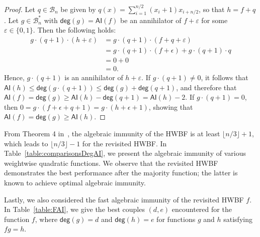 \documentclass[runningheads,orivec]{llncs}
\newcommand{\AI}{\mathsf{AI}}
\newcommand{\BN}{\mathcal{B}_n}
\newcommand{\degg}{\mathsf{deg}}
\newcommand{\hwbf}{\textsf{HWBF}}
\let\leq=\leqslant
\let\geq=\geqslant
\begin{document}
    \begin{proof}
    	Let $q\in\BN$ be given by $q(x)=\sum_{i=1}^{n/2} (x_i+1) x_{i+n/2}$, so that $h=f+q$.
    	Let $g\in\BN^*$ with $\degg(g)=\AI(f)$ be an annihilator of $f+ \varepsilon$ for some $\varepsilon\in\{0,1\}$. Then the following holds:
    	\begin{align*}
    		g\cdot(q+1)\cdot(h+\varepsilon)&= g\cdot(q+1)\cdot(f+q+\varepsilon)\\
    		&=g\cdot(q+1)\cdot(f+\epsilon)+g\cdot(q+1)\cdot q\\
    		&=0+0\\
    		&=0.
    	\end{align*}
    	Hence, $g\cdot(q+1)$ is an annihilator of $h+ \varepsilon$. If $g\cdot(q+1)\ne 0$, it follows that $\AI(h)\leq\degg(g\cdot(q+1))\leq\degg(g)+\degg(q+1)$, and therefore that $\AI(f)=\degg(g)\geq\AI(h)-\degg(q+1)=\AI(h)-2$. If $g\cdot(q+1)=0$, then $0=g\cdot(f+\epsilon+q+1)=g\cdot(h+\epsilon+1)$, showing that $\AI(f)=\degg(g)\geq\AI(h)$.
    \end{proof}
    
    From Theorem 4 in~\cite{DAM:WCST14}, the algebraic immunity of the \hwbf{} is at least $\lfloor n/3\rfloor +1$, which leads to $\lfloor n/3\rfloor -1$ for the revisited \hwbf{}. In Table~\ref{table:comparisonsDegAI}, we present the algebraic immunity of various weightwise quadratic functions. We observe that the revisited \hwbf{} demonstrates the best performance after the majority function; the latter is known to achieve optimal algebraic immunity.
    
    Lastly, we also considered the fast algebraic immunity of the revisited \hwbf{} $f$. In Table~\ref{table:FAI}, we give the best couples $(d,e)$ encountered for the function $f$, where $\degg(g)=d$ and $\degg(h)=e$ for functions $g$ and $h$ satisfying $fg=h$.
    
    \bigskip
    
\end{document}
